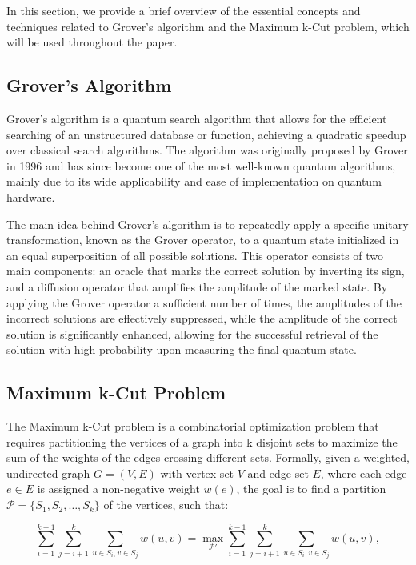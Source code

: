 In this section, we provide a brief overview of the essential concepts and techniques related to Grover's algorithm and the Maximum k-Cut problem, which will be used throughout the paper.

\subsection{Grover's Algorithm}

Grover's algorithm is a quantum search algorithm that allows for the efficient searching of an unstructured database or function, achieving a quadratic speedup over classical search algorithms. The algorithm was originally proposed by Grover in 1996 \cite{grover1996fast} and has since become one of the most well-known quantum algorithms, mainly due to its wide applicability and ease of implementation on quantum hardware.

The main idea behind Grover's algorithm is to repeatedly apply a specific unitary transformation, known as the Grover operator, to a quantum state initialized in an equal superposition of all possible solutions. This operator consists of two main components: an oracle that marks the correct solution by inverting its sign, and a diffusion operator that amplifies the amplitude of the marked state. By applying the Grover operator a sufficient number of times, the amplitudes of the incorrect solutions are effectively suppressed, while the amplitude of the correct solution is significantly enhanced, allowing for the successful retrieval of the solution with high probability upon measuring the final quantum state.

\subsection{Maximum k-Cut Problem}

The Maximum k-Cut problem is a combinatorial optimization problem that requires partitioning the vertices of a graph into k disjoint sets to maximize the sum of the weights of the edges crossing different sets. Formally, given a weighted, undirected graph $G = (V, E)$ with vertex set $V$ and edge set $E$, where each edge $e \in E$ is assigned a non-negative weight $w(e)$, the goal is to find a partition $\mathcal{P} = \{S_1, S_2, \dots, S_k\}$ of the vertices, such that:

\begin{equation}
\sum_{i=1}^{k-1} \sum_{j=i+1}^{k} \sum_{u \in S_i, v \in S_j} w(u, v) = \max_{\mathcal{P'}} \sum_{i=1}^{k-1} \sum_{j=i+1}^{k} \sum_{u \in S_i, v \in S_j} w(u, v),
\label{eq:max_k_cut}
\end{equation}

